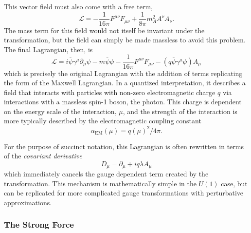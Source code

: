 This vector field must also come with a free term, 
\begin{equation}
\mathcal{L} = -\frac{1}{16\pi}F^{\mu\nu}F_{\mu\nu} + \frac{1}{8\pi}m_A^2A^\nu A_\nu . 
\end{equation}
The mass term for this field would not itself be invariant under the transformation, but the field can simply be made massless to avoid this problem. The final Lagrangian, then, is 
\begin{equation}
\mathcal{L} = i\bar{\psi}\gamma^\mu \partial_\mu\psi - m \bar{\psi}\psi -\frac{1}{16\pi}F^{\mu\nu}F_{\mu\nu} - (q\bar{\psi}\gamma^\mu\psi)A_\mu
\label{eq:l_em}
\end{equation}
which is precisely the original Lagrangian with the addition of terms replicating the form of the Maxwell Lagrangian. In a quantized interpretation, it describes a field that interacts with particles with non-zero electromagnetic charge $q$ via interactions with a massless spin-1 boson, the photon. This charge is dependent on the energy scale of the interaction, $\mu$, and the strength of the interaction is more typically described by the electromagnetic coupling constant
\begin{equation}
\alpha_\text{EM}(\mu) =  q(\mu)^2 / 4\pi . 
\end{equation}

For the purpose of succinct notation, this Lagrangian is often rewritten in terms of the \textit{covariant derivative}
\begin{equation}
D_\mu = \partial_\mu + iq\lambda A_\mu
\end{equation}
which immediately cancels the gauge dependent term created by the transformation. This mechanism is mathematically simple in the $U(1)$ case, but can be replicated for more complicated gauge transformations with perturbative approximations. 


\subsubsection{The Strong Force}
\label{sec:strong}

